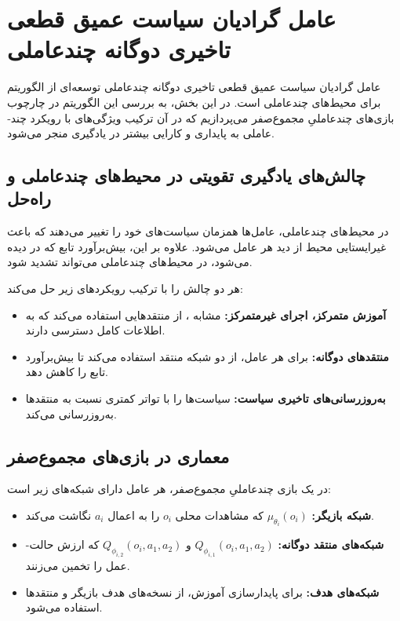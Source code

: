 \section{عامل گرادیان سیاست عمیق قطعی تاخیری دوگانه چند­عاملی}\label{sec:MATD3}

عامل گرادیان سیاست عمیق قطعی تاخیری دوگانه چند­عاملی
توسعه‌ای از الگوریتم  برای محیط‌های چند­عاملی است. در این بخش، به بررسی این الگوریتم در چارچوب بازی‌های چندعاملیِ مجموع­‌صفر می‌پردازیم که در آن ترکیب ویژگی‌های  با رویکرد چند­عاملی  به پایداری و کارایی بیشتر در یادگیری منجر می‌شود.

\subsection{چالش‌های یادگیری تقویتی در محیط‌های چند­عاملی و راه‌حل }

در محیط‌های چند­عاملی، عامل‌ها همزمان سیاست‌های خود را تغییر می‌دهند که باعث غیرایستایی محیط از دید هر عامل می‌شود. علاوه بر این، بیش‌برآورد تابع  که در  دیده می‌شود، در محیط‌های چند­عاملی می‌تواند تشدید شود.

 هر دو چالش را با ترکیب رویکردهای زیر حل می‌کند:
\begin{itemize}
    \item \textbf{آموزش متمرکز، اجرای غیرمتمرکز:} مشابه ، از منتقدهایی استفاده می‌کند که به اطلاعات کامل دسترسی دارند.
    \item \textbf{منتقدهای دوگانه:} برای هر عامل، از دو شبکه منتقد استفاده می‌کند تا بیش‌برآورد تابع  را کاهش دهد.
    \item \textbf{به‌روزرسانی‌های تاخیری سیاست:} سیاست‌ها را با تواتر کمتری نسبت به منتقدها به‌روزرسانی می‌کند.
\end{itemize}

\subsection{معماری  در بازی‌های مجموع­‌صفر}

در یک بازی چندعاملیِ مجموع­‌صفر، هر عامل دارای شبکه‌های زیر است:

\begin{itemize}
    \item \textbf{شبکه بازیگر:} $\mu_{\theta_i}(o_i)$ که مشاهدات محلی $o_i$ را به اعمال $a_i$ نگاشت می‌کند.
    \item \textbf{شبکه‌های منتقد دوگانه:} $Q_{\phi_{i,1}}(o_i, a_1, a_2)$ و $Q_{\phi_{i,2}}(o_i, a_1, a_2)$ که ارزش حالت-عمل را تخمین می‌زنند.
    \item \textbf{شبکه‌های هدف:} برای پایدارسازی آموزش، از نسخه‌های هدف بازیگر و منتقدها استفاده می‌شود.
\end{itemize}


